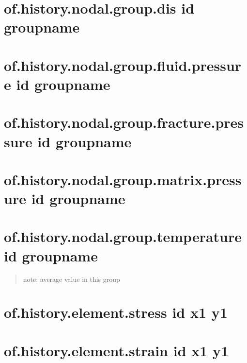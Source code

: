 \documentclass[letterpaper,10pt,english]{sphinxmanual}
\begin{document}
\section{of.history.nodal.group.dis id groupname}
\label{\detokenize{rst_tutorials/command_line_guide:of-history-nodal-group-dis-id-groupname}}

\section{of.history.nodal.group.fluid.pressure id groupname}
\label{\detokenize{rst_tutorials/command_line_guide:of-history-nodal-group-fluid-pressure-id-groupname}}

\section{of.history.nodal.group.fracture.pressure id groupname}
\label{\detokenize{rst_tutorials/command_line_guide:of-history-nodal-group-fracture-pressure-id-groupname}}

\section{of.history.nodal.group.matrix.pressure id groupname}
\label{\detokenize{rst_tutorials/command_line_guide:of-history-nodal-group-matrix-pressure-id-groupname}}

\section{of.history.nodal.group.temperature id groupname}
\label{\detokenize{rst_tutorials/command_line_guide:of-history-nodal-group-temperature-id-groupname}}\begin{quote}

note: average value in this group
\end{quote}


\section{of.history.element.stress id x1 y1}
\label{\detokenize{rst_tutorials/command_line_guide:of-history-element-stress-id-x1-y1}}

\section{of.history.element.strain id x1 y1}
\label{\detokenize{rst_tutorials/command_line_guide:of-history-element-strain-id-x1-y1}}
\end{document}
